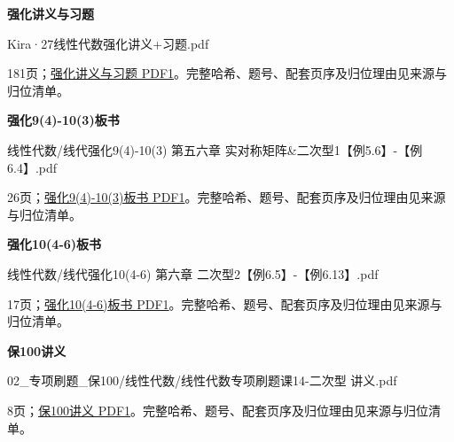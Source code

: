\documentclass[UTF8,fontset=fandol,11pt,a4paper]{ctexart}
\newcommand{\source}[1]{{\footnotesize\color{Muted}#1\par}}
\begin{document}
\textbf{强化讲义与习题}\par
Kira·27线性代数强化讲义+习题.pdf\par
\source{181页；\href{file:///Users/skyintelligence/Desktop/\%E5\%BE\%97\%E8\%AF\%BB\%E4\%B8\%AA\%E7\%A0\%94-\%E5\%8C\%97\%E5\%A4\%A7\%E8\%BD\%AF\%E5\%BE\%AE/\%E6\%95\%B0\%E5\%AD\%A6\%20150/Kira\%C2\%B727\%E7\%BA\%BF\%E6\%80\%A7\%E4\%BB\%A3\%E6\%95\%B0\%E5\%BC\%BA\%E5\%8C\%96\%E8\%AE\%B2\%E4\%B9\%89\%2B\%E4\%B9\%A0\%E9\%A2\%98.pdf\#page=1}{强化讲义与习题 PDF1}。完整哈希、题号、配套页序及归位理由见来源与归位清单。}
\textbf{强化9(4)-10(3)板书}\par
线性代数/线代强化9(4)-10(3)  第五六章 实对称矩阵\&二次型1【例5.6】-【例6.4】.pdf\par
\source{26页；\href{file:///Users/skyintelligence/Desktop/\%E5\%BE\%97\%E8\%AF\%BB\%E4\%B8\%AA\%E7\%A0\%94-\%E5\%8C\%97\%E5\%A4\%A7\%E8\%BD\%AF\%E5\%BE\%AE/\%E6\%95\%B0\%E5\%AD\%A6\%20150/\%E7\%BA\%BF\%E6\%80\%A7\%E4\%BB\%A3\%E6\%95\%B0/\%E7\%BA\%BF\%E4\%BB\%A3\%E5\%BC\%BA\%E5\%8C\%969\%284\%29-10\%283\%29\%20\%20\%E7\%AC\%AC\%E4\%BA\%94\%E5\%85\%AD\%E7\%AB\%A0\%20\%E5\%AE\%9E\%E5\%AF\%B9\%E7\%A7\%B0\%E7\%9F\%A9\%E9\%98\%B5\%26\%E4\%BA\%8C\%E6\%AC\%A1\%E5\%9E\%8B1\%E3\%80\%90\%E4\%BE\%8B5.6\%E3\%80\%91-\%E3\%80\%90\%E4\%BE\%8B6.4\%E3\%80\%91.pdf\#page=1}{强化9(4)-10(3)板书 PDF1}。完整哈希、题号、配套页序及归位理由见来源与归位清单。}
\textbf{强化10(4-6)板书}\par
线性代数/线代强化10(4-6)  第六章 二次型2【例6.5】-【例6.13】.pdf\par
\source{17页；\href{file:///Users/skyintelligence/Desktop/\%E5\%BE\%97\%E8\%AF\%BB\%E4\%B8\%AA\%E7\%A0\%94-\%E5\%8C\%97\%E5\%A4\%A7\%E8\%BD\%AF\%E5\%BE\%AE/\%E6\%95\%B0\%E5\%AD\%A6\%20150/\%E7\%BA\%BF\%E6\%80\%A7\%E4\%BB\%A3\%E6\%95\%B0/\%E7\%BA\%BF\%E4\%BB\%A3\%E5\%BC\%BA\%E5\%8C\%9610\%284-6\%29\%20\%20\%E7\%AC\%AC\%E5\%85\%AD\%E7\%AB\%A0\%20\%E4\%BA\%8C\%E6\%AC\%A1\%E5\%9E\%8B2\%E3\%80\%90\%E4\%BE\%8B6.5\%E3\%80\%91-\%E3\%80\%90\%E4\%BE\%8B6.13\%E3\%80\%91.pdf\#page=1}{强化10(4-6)板书 PDF1}。完整哈希、题号、配套页序及归位理由见来源与归位清单。}
\textbf{保100讲义}\par
02\_专项刷题\_保100/线性代数/线性代数专项刷题课14-二次型 讲义.pdf\par
\source{8页；\href{file:///Users/skyintelligence/Desktop/\%E5\%BE\%97\%E8\%AF\%BB\%E4\%B8\%AA\%E7\%A0\%94-\%E5\%8C\%97\%E5\%A4\%A7\%E8\%BD\%AF\%E5\%BE\%AE/\%E6\%95\%B0\%E5\%AD\%A6\%20150/02\_\%E4\%B8\%93\%E9\%A1\%B9\%E5\%88\%B7\%E9\%A2\%98\_\%E4\%BF\%9D100/\%E7\%BA\%BF\%E6\%80\%A7\%E4\%BB\%A3\%E6\%95\%B0/\%E7\%BA\%BF\%E6\%80\%A7\%E4\%BB\%A3\%E6\%95\%B0\%E4\%B8\%93\%E9\%A1\%B9\%E5\%88\%B7\%E9\%A2\%98\%E8\%AF\%BE14-\%E4\%BA\%8C\%E6\%AC\%A1\%E5\%9E\%8B\%20\%E8\%AE\%B2\%E4\%B9\%89.pdf\#page=1}{保100讲义 PDF1}。完整哈希、题号、配套页序及归位理由见来源与归位清单。}
\end{document}
